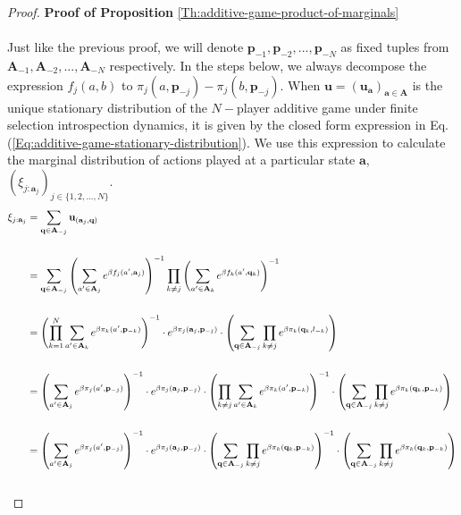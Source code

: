 \documentclass[11pt]{article}
\theoremstyle{plainCl1}
\theoremstyle{plainCl2}
\newcommand{\A}{\mathbf{A}}
\newcommand{\abf}{\mathbf{a}}
\newcommand{\qbf}{\mathbf{q}}
\newcommand{\pbf}{\mathbf{p}}
\newcommand{\ubf}{\mathbf{u}}
\begin{document}
\begin{proof}
\textbf{Proof of Proposition} \ref{Th:additive-game-product-of-marginals} \\ \\ 
Just like the previous proof, we will denote $\pbf_{-1}, \pbf_{-2},...,\pbf_{-N} $ as fixed tuples from $\A_{-1}, \A_{-2},...,\A_{-N}$ respectively. In the steps below, we always decompose the expression $f_j(a,b)$ to $\pi_j(a,\pbf_{-j}) - \pi_j(b,\pbf_{-j})$. When $\ubf = (\ubf_\abf)_{\abf \in \A}$ is the unique stationary distribution of the $N-$player additive game under finite selection introspection dynamics, it is given by the closed form expression in Eq. (\ref{Eq:additive-game-stationary-distribution}). We use this expression to calculate the marginal distribution of actions played at a particular state $\abf$, $(\xi_{j:\abf_j})_{j \in \{1,2,...,N\}}$. 
\newpage
\begin{align}
\xi_{j:\abf_j} &= \sum_{\qbf \in \A_{-j}} \ubf_{(\abf_j,\qbf)} \\ \notag \\
&= \sum_{\qbf \in \A_{-j}} \left( \sum_{a' \in \A_j} \displaystyle e^{\beta f_j(a',\abf_j)}\right)^{-1} \prod_{k \neq j} \left( \sum_{a' \in \A_k} \displaystyle e^{\beta f_k(a',\qbf_k)}\right)^{-1} \\ \notag \\
&= \left( \prod_{k=1}^N \sum_{a' \in \A_k} \displaystyle e^{\beta \pi_k (a', \pbf_{-k})}\right)^{-1} \cdot \displaystyle e^{\beta \pi_j(\abf_j, \pbf_{-j})} \cdot \left( \sum_{\qbf \in \A_{-j}} \prod_{k \neq j} e^{\beta \pi_k(\qbf_k, l_{-k})} \right) \\ \notag \\
\label{step-prod-sum}
&= \left( \sum_{a' \in \A_j} \displaystyle e^{\beta \pi_j(a',\pbf_{-j})}\right)^{-1} \cdot \displaystyle e^{\beta \pi_j(\abf_j, \pbf_{-j})}\cdot \left( \prod_{k\neq j} \sum_{a' \in \A_k} \displaystyle e^{\beta \pi_k(a',\pbf_{-k})}\right)^{-1} \cdot \left( \sum_{\qbf \in \A_{-j}} \prod_{k \neq j} e^{\beta \pi_k(\qbf_k,\pbf_{-k})} \right) \\ \notag \\ 
\label{step-sum-prod}
&= \left( \sum_{a' \in \A_j} \displaystyle e^{\beta \pi_j(a',\pbf_{-j})}\right)^{-1} \cdot \displaystyle e^{\beta \pi_j(\abf_j, \pbf_{-j})}\cdot \left( \sum_{\qbf \in \A_{-j}} \prod_{k\neq j}  \displaystyle e^{\beta \pi_k(\qbf_k,\pbf_{-k})} \right)^{-1} \cdot \left( \sum_{\qbf \in \A_{-j}} \prod_{k \neq j} e^{\beta \pi_k(\qbf_k,\pbf_{-k})}  \right) \\ \notag \\ 

\end{align}
\end{proof}
\end{document}
